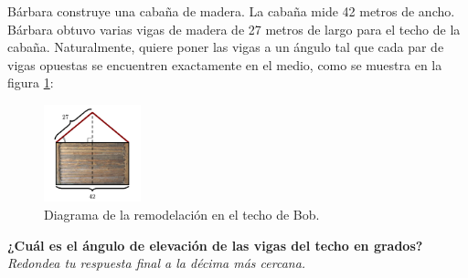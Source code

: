 Bárbara construye una cabaña de madera. La cabaña mide 42 metros de ancho.
Bárbara obtuvo varias vigas de madera de 27 metros de largo para el techo de la cabaña.
Naturalmente, quiere poner las vigas a un ángulo tal que cada par de vigas opuestas se
encuentren exactamente en el medio, como se muestra en la figura \ref{fig:techo2}:
\begin{figure}[H]
    \begin{center}
        \includegraphics[width=0.25\textwidth]{../images/techo2.png}
    \end{center}
    \caption{Diagrama de la remodelación en el techo de Bob.}
    \label{fig:techo2}
\end{figure}
\textbf{¿Cuál es el ángulo de elevación de las vigas del techo en grados?}\\
\textit{Redondea tu respuesta final a la décima más cercana.}